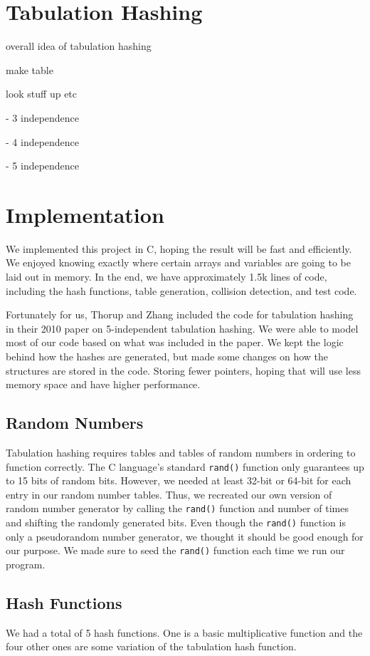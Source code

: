 \documentclass[11pt]{article}
\begin{document}
\section{Tabulation Hashing}
overall idea of tabulation hashing

make table

look stuff up etc
 
- 3 independence
 
- 4 independence

- 5 independence
\section{Implementation}

We implemented this project in C, hoping the result will be fast and efficiently.
We enjoyed knowing exactly where certain arrays and variables are going to
be laid out in memory. In the end, we have approximately 1.5k lines of code,
including the hash functions, table generation, collision detection, and test code.

Fortunately for us, Thorup and Zhang included the code for tabulation hashing in their
2010 paper on 5-independent tabulation hashing. We were able to model most of our
code based on what was included in the paper. We kept the logic behind how the hashes
are generated, but made some changes on how the structures are stored in the code. 
Storing fewer pointers, hoping that will use less memory space and have higher performance.

\subsection{Random Numbers}

Tabulation hashing requires tables and tables of random numbers in ordering 
to function correctly. The C language's standard \texttt{rand()} function only
guarantees up to 15 bits of random bits. However, we needed at least 32-bit
or 64-bit for each entry in our random number tables. Thus, we recreated our 
own version of random number generator by calling the \texttt{rand()} function
and number of times and shifting the randomly generated bits. Even though
the \texttt{rand()} function is only a pseudorandom number generator, we thought
it should be good enough for our purpose. We made sure to seed 
the \texttt{rand()} function each time we run our program.

\subsection{Hash Functions}
We had a total of 5 hash functions. One is a basic multiplicative function and the four other ones are some variation of the tabulation hash function.
\end{document}
